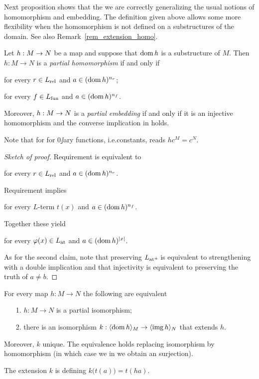 \documentclass[creche.tex]{subfiles}
\begin{document}
Next proposition shows that the we are correctly generalizing the usual notions of homomorphism and embedding. The definition given above allows some more flexibility when the homomorphism is not defined on a substructures of the domain. See also Remark~\ref{rem_extension_homo}.

\begin{proposition}
Let $h:M\imp N$ be a map and suppose that $\dom h$ is a substructure of $M$. Then $h:M\to N$ is a \emph{partial homomorphism\/} if and only if 

\hfill for every $r\in L_{\rm rel}$ and $a\in(\dom h)^{n_r}$;\smallskip\par

\hfill for every $f\in L_{\rm fun}$ and $a\in(\dom h)^{n_f}$.

Moreover, $h:M\imp N$ is a \emph{partial embedding\/} if and only if it is an injective homomorphism and the converse implication in  holds.
\end{proposition}

Note that for for $0\jj$ary functions, i.e.\@ constants,  reads $hc^M=c^N$.\medskip

\begin{proof}[Sketch of proof]
Requirement  is equivalent to 

\hfill for every $r\in L_{\rm rel}$ and $a\in(\dom h)^{n_r}$.

Requirement  implies

\hfill for every $L$-term $t(x)$ and $a\in(\dom h)^{n_f}$.

Together these yield

\hfill for every $\phi(x)\in L_{\rm at}$ and $a\in(\dom h)^{|x|}$.

As for the second claim, note that preserving  $\atpmL$ is equivalent to strengthening  with a double implication and that injectivity is equivalent to preserving the truth of $a\neq b$.
\end{proof}

\begin{remark}\label{rem_extension_homo}
For every map  $h:M\to N$ the following are equivalent 
\begin{itemize}
\item[1.] $h:M\to N$ is a partial isomorphism;
\item[2.] there is an isomorphism $k:\<\dom h\>_M\to\<\range h\>_N$ that extends $h$.
\end{itemize}
Moreover, $k$ unique. The equivalence holds replacing isomorphism by homomorphism (in which case we in  we obtain an surjection).

The extension $k$ is defining $k\big(t(a)\big)=t(ha)$.\QED
\end{remark}
\end{document}

